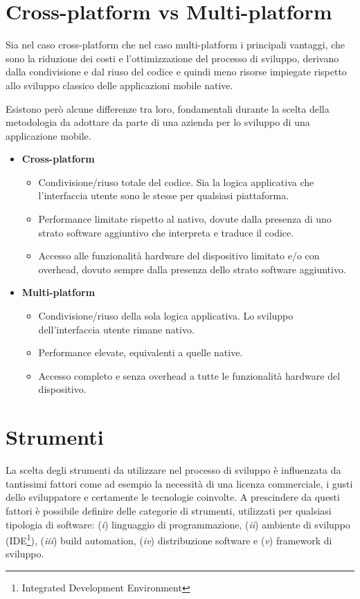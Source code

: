 \section{Cross-platform vs Multi-platform}
Sia nel caso cross-platform che nel caso multi-platform i principali vantaggi, che sono la riduzione dei costi e l'ottimizzazione del processo di sviluppo, derivano dalla condivisione e dal riuso del codice e quindi meno risorse impiegate rispetto allo sviluppo classico delle applicazioni mobile native.

Esistono però alcune differenze tra loro, fondamentali durante la scelta della metodologia da adottare da parte di una azienda per lo sviluppo di una applicazione mobile.
\begin{itemize}
    \item \textbf{Cross-platform}
    \begin{itemize}
        \item Condivisione/riuso totale del codice. Sia la logica applicativa che l'interfaccia utente sono le stesse per qualsiasi piattaforma.
        \item Performance limitate rispetto al nativo, dovute dalla presenza di uno strato software aggiuntivo che interpreta e traduce il codice.
        \item Accesso alle funzionalità hardware del dispositivo limitato e/o con overhead, dovuto sempre dalla presenza dello strato software aggiuntivo.
    \end{itemize}
    \item \textbf{Multi-platform}
    \begin{itemize}
        \item Condivisione/riuso della sola logica applicativa. Lo sviluppo dell'interfaccia utente rimane nativo.
        \item Performance elevate, equivalenti a quelle native.
        \item Accesso completo e senza overhead a tutte le funzionalità hardware del dispositivo.
    \end{itemize}
\end{itemize}

\section{Strumenti}
\label{app-multiplatform-tools}
La scelta degli strumenti da utilizzare nel processo di sviluppo è influenzata da tantissimi fattori come ad esempio la necessità di una licenza commerciale, i gusti dello sviluppatore e certamente le tecnologie coinvolte. A prescindere da questi fattori è possibile definire delle categorie di strumenti, utilizzati per qualsiasi tipologia di software: (\textit{i}) linguaggio di programmazione, (\textit{ii}) ambiente di sviluppo (IDE\footnote{Integrated Development Environment}), (\textit{iii}) build automation, (\textit{iv}) distribuzione software e (\textit{v}) framework di sviluppo.

